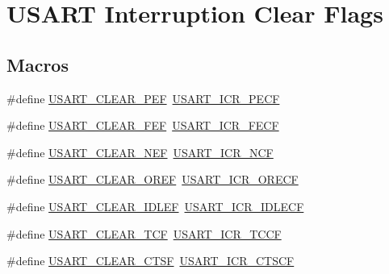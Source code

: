 \hypertarget{group___u_s_a_r_t___i_t___c_l_e_a_r___flags}{}\section{U\+S\+A\+RT Interruption Clear Flags}
\label{group___u_s_a_r_t___i_t___c_l_e_a_r___flags}
\subsection*{Macros}
\begin{DoxyCompactItemize}
\item 
\#define \hyperlink{group___u_s_a_r_t___i_t___c_l_e_a_r___flags_gaf83c3d570a430dfd1a7e7a8b583736f2}{U\+S\+A\+R\+T\+\_\+\+C\+L\+E\+A\+R\+\_\+\+P\+EF}~\hyperlink{group___peripheral___registers___bits___definition_ga404185136eb68f679e82e0187d66e411}{U\+S\+A\+R\+T\+\_\+\+I\+C\+R\+\_\+\+P\+E\+CF}
\item 
\#define \hyperlink{group___u_s_a_r_t___i_t___c_l_e_a_r___flags_ga9aa038b779783f685fbc834ebf4c3077}{U\+S\+A\+R\+T\+\_\+\+C\+L\+E\+A\+R\+\_\+\+F\+EF}~\hyperlink{group___peripheral___registers___bits___definition_ga8400b4500c41800e5f18fc7291a64c9f}{U\+S\+A\+R\+T\+\_\+\+I\+C\+R\+\_\+\+F\+E\+CF}
\item 
\#define \hyperlink{group___u_s_a_r_t___i_t___c_l_e_a_r___flags_ga6c4b527c1b6ba5a01bbf6d6d3c6d6784}{U\+S\+A\+R\+T\+\_\+\+C\+L\+E\+A\+R\+\_\+\+N\+EF}~\hyperlink{group___peripheral___registers___bits___definition_gad50b0d2460df1cbddd9576c2f4637312}{U\+S\+A\+R\+T\+\_\+\+I\+C\+R\+\_\+\+N\+CF}
\item 
\#define \hyperlink{group___u_s_a_r_t___i_t___c_l_e_a_r___flags_ga3f17bca944fa3409626872985e722dbd}{U\+S\+A\+R\+T\+\_\+\+C\+L\+E\+A\+R\+\_\+\+O\+R\+EF}~\hyperlink{group___peripheral___registers___bits___definition_ga375f76b0670ffeb5d2691592d9e7c422}{U\+S\+A\+R\+T\+\_\+\+I\+C\+R\+\_\+\+O\+R\+E\+CF}
\item 
\#define \hyperlink{group___u_s_a_r_t___i_t___c_l_e_a_r___flags_gad9927597dca4f88a05c0d5151049470a}{U\+S\+A\+R\+T\+\_\+\+C\+L\+E\+A\+R\+\_\+\+I\+D\+L\+EF}~\hyperlink{group___peripheral___registers___bits___definition_ga9d4d7675c0d36ce4347c3509d27c0760}{U\+S\+A\+R\+T\+\_\+\+I\+C\+R\+\_\+\+I\+D\+L\+E\+CF}
\item 
\#define \hyperlink{group___u_s_a_r_t___i_t___c_l_e_a_r___flags_ga138392691d138fd7687e93fa8ec9cfda}{U\+S\+A\+R\+T\+\_\+\+C\+L\+E\+A\+R\+\_\+\+T\+CF}~\hyperlink{group___peripheral___registers___bits___definition_gacf92ea54425a962dde662b10b61d0250}{U\+S\+A\+R\+T\+\_\+\+I\+C\+R\+\_\+\+T\+C\+CF}
\item 
\#define \hyperlink{group___u_s_a_r_t___i_t___c_l_e_a_r___flags_ga75f4e0fb00423650cde6e4cd8f33c9f0}{U\+S\+A\+R\+T\+\_\+\+C\+L\+E\+A\+R\+\_\+\+C\+T\+SF}~\hyperlink{group___peripheral___registers___bits___definition_ga8a630d4a5e4ce10ad6fdb9da47126f4f}{U\+S\+A\+R\+T\+\_\+\+I\+C\+R\+\_\+\+C\+T\+S\+CF}
\end{DoxyCompactItemize}


